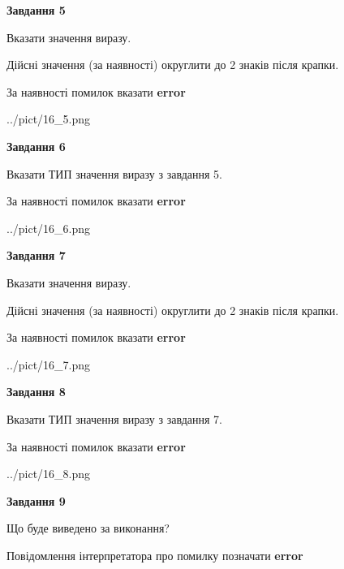 \documentclass[11pt, ukrainian]{article}
\begin{document}
{\begin {large}
{\begin {center}\textbf{Завдання 5}\end {center}}\par
Вказати значення виразу. \par
Дійсні значення (за наявності) округлити до 2 знаків після крапки. \par
За наявності помилок вказати \textbf{error}

\begin{center}
	{../pict/16_5.png}
\end{center}
\newpage

{\begin {center}\textbf{Завдання 6}\end {center}}\par
Вказати ТИП значення виразу з завдання 5. \par
За наявності помилок вказати \textbf{error}

\begin{center}
	{../pict/16_6.png}
\end{center}
\newpage

{\begin {center}\textbf{Завдання 7}\end {center}}\par
Вказати значення виразу. \par
Дійсні значення (за наявності) округлити до 2 знаків після крапки. \par
За наявності помилок вказати \textbf{error}

\begin{center}
	{../pict/16_7.png}
\end{center}
\newpage

{\begin {center}\textbf{Завдання 8}\end {center}}\par
Вказати ТИП значення виразу з завдання 7. \par
За наявності помилок вказати \textbf{error}

\begin{center}
	{../pict/16_8.png}
\end{center}
\newpage

{\begin {center}\textbf{Завдання 9}\end {center}}\par
Що буде виведено за виконання? \par
Повідомлення інтерпретатора про помилку позначати \textbf{error}


\end{large}}
\end{document}
